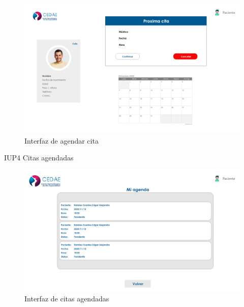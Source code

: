 \documentclass[12pt,letterpaper]{article}
\begin{document}
            \begin{figure}[H]
                \centering
                \includegraphics [scale=0.18]{interfaces/pac_cita_no_primera}
                \caption{Interfaz de agendar cita}
            \end{figure}
        IUP4 Citas agendadas
            \begin{figure}[H]
                \centering
                \includegraphics [scale=0.2]{interfaces/pac_citas_agendadas}
                \caption{Interfaz de citas agendadas}
            \end{figure}
\end{document}
